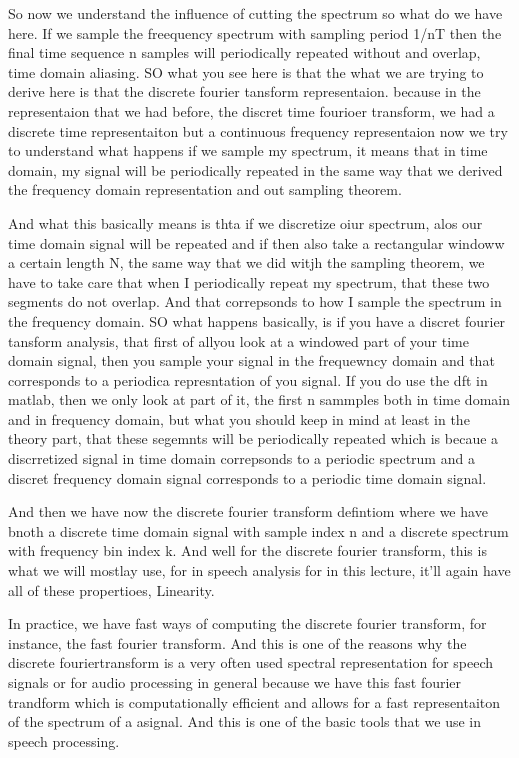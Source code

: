 So now we understand the influence of cutting the spectrum so what do we have here. If we sample the freequency spectrum with sampling period 1/nT then the final time sequence n samples will periodically repeated without and overlap, time domain aliasing. SO what you see here is that the what we are trying to derive here is that the discrete fourier tansform representaion. because in the representaion that we had before, the discret time fourioer  transform,  we had a discrete time representaiton but a continuous frequency representaion now we try to understand what happens if we sample my spectrum, it means that in time domain, my signal will be periodically repeated in the same way that we derived the frequency domain representation and out sampling theorem.

And what this basically means is thta if we discretize oiur spectrum, alos our time domain signal will be repeated and if then also take a rectangular windoww a certain length N, the same way that we did witjh the sampling theorem, we have to take care that when I periodically repeat my spectrum, that these two segments do not overlap. And that correpsonds to how I sample the spectrum in the frequency domain. SO what happens basically, is if you have a discret fourier tansform analysis, that first of allyou look at a windowed part of your time domain signal, then you sample your signal in the frequewncy domain and that corresponds to a periodica represntation of you signal.  If you do use the dft in matlab, then we only look at part of it, the first n sammples both in time domain and in frequency domain, but what you should keep in mind at least in the theory part, that these segemnts will be periodically repeated which is becaue a discrretized signal in time domain correpsonds to a periodic spectrum and a discret frequency domain signal corresponds to a periodic time domain signal. 

And then we have now the discrete fourier transform defintiom where we have bnoth a discrete time domain signal with sample index n and a discrete spectrum with frequency bin index k. And well for the discrete fourier transform, this is what we will mostlay use, for in speech analysis for in this lecture, it'll again have all of these propertioes, Linearity.

In practice, we have fast ways of computing the discrete fourier transform, for instance, the fast fourier transform.  And this is one of the reasons why the discrete fouriertransform is a very often used  spectral representation for speech signals or for audio processing in general  because we have this fast fourier trandform  which is computationally efficient and allows for a fast representaiton of the spectrum of a asignal. And this is one of the basic tools that we use in speech processing. 

